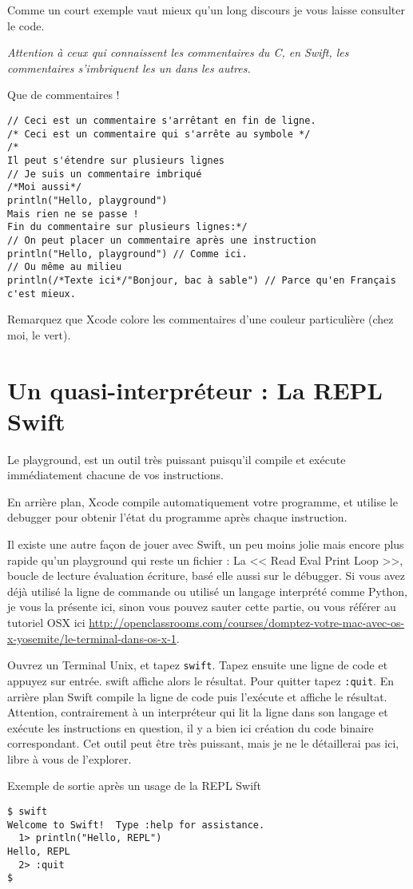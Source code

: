 Comme un court exemple vaut mieux qu’un long discours je vous laisse consulter le code.

\emph{Attention à ceux qui connaissent les commentaires du C, en Swift, les commentaires
s'imbriquent les un dans les autres.}

\begin{listing}[h]
\caption{Que de commentaires !}
\begin{verbatim}
// Ceci est un commentaire s'arrêtant en fin de ligne.
/* Ceci est un commentaire qui s'arrête au symbole */
/*
Il peut s'étendre sur plusieurs lignes
// Je suis un commentaire imbriqué
/*Moi aussi*/
println("Hello, playground")
Mais rien ne se passe !
Fin du commentaire sur plusieurs lignes:*/
// On peut placer un commentaire après une instruction
println("Hello, playground") // Comme ici.
// Ou même au milieu
println(/*Texte ici*/"Bonjour, bac à sable") // Parce qu'en Français c'est mieux.
\end{verbatim}
\end{listing}
Remarquez que Xcode colore les commentaires d'une couleur particulière (chez moi, le vert).
\section{Un quasi-interpréteur : La REPL Swift}
Le playground, est un outil très puissant puisqu’il compile et exécute immédiatement
chacune de vos instructions.

En arrière plan, Xcode compile automatiquement votre programme, et utilise le debugger
pour obtenir l’état du programme après chaque instruction.

Il existe une autre façon de jouer avec Swift, un peu moins jolie mais encore plus rapide
qu’un playground qui reste un fichier : La << Read Eval Print Loop >>, boucle de lecture évaluation écriture, basé elle aussi sur le
débugger. Si vous avez déjà utilisé la ligne de commande ou utilisé un langage interprété
comme Python, je vous la présente ici, sinon vous pouvez sauter cette partie, ou vous
référer au tutoriel OSX ici \url{http://openclassrooms.com/courses/domptez-votre-mac-avec-os-x-yosemite/le-terminal-dans-os-x-1}.

Ouvrez un Terminal Unix, et tapez \verb"swift".
Tapez ensuite une ligne de code et appuyez sur entrée.
swift affiche alors le résultat.
Pour quitter tapez \verb":quit".
En arrière plan Swift compile la ligne de code puis l'exécute et affiche le résultat.
Attention, contrairement à un interpréteur qui lit la ligne dans son langage et exécute
les instructions en question, il y a bien ici création du code binaire correspondant.
Cet outil peut être très puissant, mais je ne le détaillerai pas ici, libre à vous de l’explorer.
\begin{listing}[h]
\caption{Exemple de sortie après un usage de la REPL Swift}
\begin{verbatim}
$ swift
Welcome to Swift!  Type :help for assistance.
  1> println("Hello, REPL")
Hello, REPL
  2> :quit
$
\end{verbatim}
\end{listing}